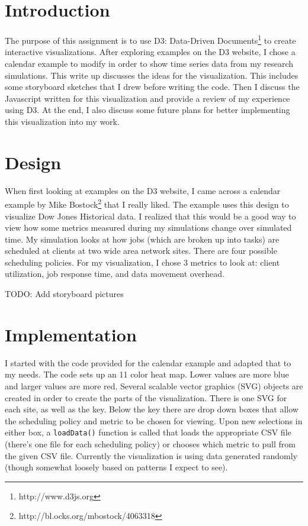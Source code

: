 \documentclass[11pt]{article}
\numberwithin{figure}{section}
\begin{document}
\maketitle
\section{Introduction}
The purpose of this assignment is to use D3: Data-Driven Documents\footnote{http://www.d3js.org} to create interactive visualizations.  After exploring examples on the D3 website, I chose a calendar example to modify in order to show time series data from my research simulations.  This write up discusses the ideas for the visualization.  This includes some storyboard sketches that I drew before writing the code. Then I discuss the Javascript written for this visualization and provide a review of my experience using D3.  At the end, I also discuss some future plans for better implementing this visualization into my work.

\section{Design}
When first looking at examples on the D3 website, I came across a calendar example by Mike Bostock\footnote{http://bl.ocks.org/mbostock/4063318} that I really liked.  The example uses this design to visualize Dow Jones Historical data.  I realized that this would be a good way to view how some metrics measured during my simulations change over simulated time.  My simulation looks at how jobs (which are broken up into tasks) are scheduled at clients at two wide area network sites.  There are four possible scheduling policies.  For my visualization, I chose 3 metrics to look at: client utilization, job response time, and data movement overhead.  

\color{red}TODO: Add storyboard pictures\color{black}



\section{Implementation}
I started with the code provided for the calendar example and adapted that to my needs.  The code sets up an 11 color heat map.  Lower values are more blue and larger values are more red.  Several scalable vector graphics (SVG) objects are created in order to create the parts of the visualization.  There is one SVG for each site, as well as the key.  Below the key there are drop down boxes that allow the scheduling policy and metric to be chosen for viewing.  Upon new selections in either box, a \texttt{loadData()} function is called that loads the appropriate CSV file (there's one file for each scheduling policy) or chooses which metric to pull from the given CSV file.  Currently the visualization is using data generated randomly (though somewhat loosely based on patterns I expect to see).  
\end{document}

